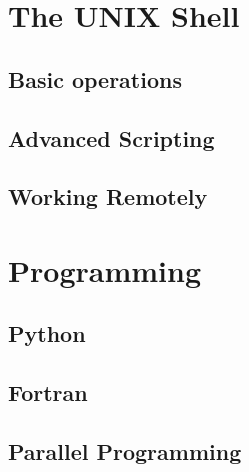 \documentclass[11pt]{book}
\begin{document}


\mainmatter

\part{The UNIX Shell}

\chapter{Basic operations}




\chapter{Advanced Scripting}


\chapter{Working Remotely}



\part{Programming}

\chapter{Python}

\chapter{Fortran}

\chapter{Parallel Programming}



\end{document}
